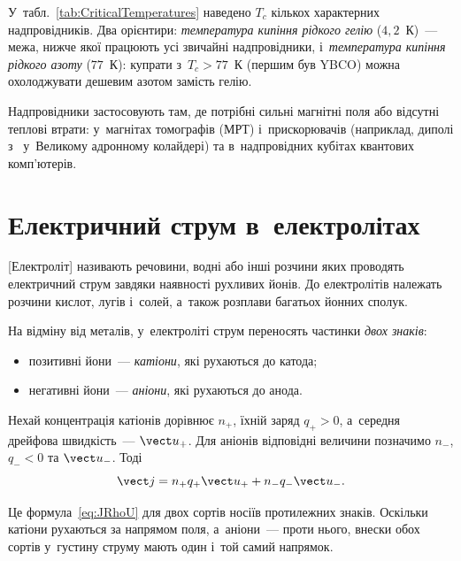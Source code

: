 У~табл.~\ref{tab:CriticalTemperatures} наведено $T_c$ кількох характерних надпровідників.
Два орієнтири: \emph{температура кипіння рідкого гелію} ($4{,}2$~К)~--- межа, нижче якої
працюють усі звичайні надпровідники, і~\emph{температура кипіння рідкого азоту} ($77$~К):
купрати з~$T_c>77$~К (першим був YBCO) можна охолоджувати дешевим азотом замість гелію.

Надпровідники застосовують там, де потрібні сильні магнітні поля або відсутні теплові
втрати: у~магнітах томографів (МРТ) і~прискорювачів (наприклад, диполі з~
у~Великому адронному колайдері) та в~надпровідних кубітах квантових комп'ютерів.


\section{Електричний струм в~електролітах}\label{sec:CurrentInElectrolytes}\hypertarget{current-in-electrolytes}{}


[Електроліт] називають речовини, водні або інші розчини яких проводять
електричний струм завдяки наявності рухливих йонів. До електролітів належать розчини
кислот, лугів і~солей, а~також розплави багатьох йонних сполук.

На відміну від металів, у~електроліті струм переносять частинки \emph{двох знаків}:
\begin{itemize}
	\item позитивні йони~--- \emph{катіони}, які рухаються до катода;
	\item негативні йони~--- \emph{аніони}, які рухаються до анода.
\end{itemize}

Нехай концентрація катіонів дорівнює $n_+$, їхній заряд $q_+>0$, а~середня дрейфова
швидкість~--- $\vect u_+$. Для аніонів відповідні величини позначимо $n_-$, $q_-<0$ та
$\vect u_-$. Тоді
\begin{equation}\label{eq:ElectrolyteCurrent}
	\vect j = n_+q_+\vect u_+ + n_-q_-\vect u_-.
\end{equation}

Це формула~\eqref{eq:JRhoU} для двох сортів носіїв протилежних знаків. Оскільки катіони
рухаються за напрямом поля, а~аніони~--- проти нього, внески обох сортів у~густину струму
мають один і~той самий напрямок.

